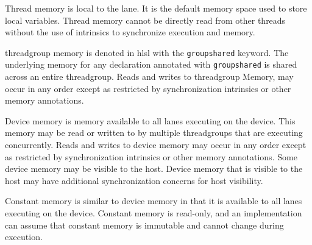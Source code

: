 
\p Thread memory is local to the \gls{lane}. It is the default memory space used to
store local variables. Thread memory cannot be directly read from other threads
without the use of intrinsics to synchronize execution and memory.


\p \gls{threadgroup} memory is denoted in \acrshort{hlsl} with the
\texttt{groupshared} keyword. The underlying memory for any declaration
annotated with \texttt{groupshared} is shared across an entire
\gls{threadgroup}. Reads and writes to \gls{threadgroup} Memory, may occur in
any order except as restricted by synchronization intrinsics or other memory
annotations.


\p Device memory is memory available to all \gls{lane}s executing on the device.
This memory may be read or written to by multiple \gls{threadgroup}s that are
executing concurrently. Reads and writes to device memory may occur in any order
except as restricted by synchronization intrinsics or other memory annotations.
Some device memory may be visible to the host. Device memory that is visible to
the host may have additional synchronization concerns for host visibility.


\p Constant memory is similar to device memory in that it is available to all
\gls{lane}s executing on the device. Constant memory is read-only, and an
implementation can assume that constant memory is immutable and cannot change
during execution.
